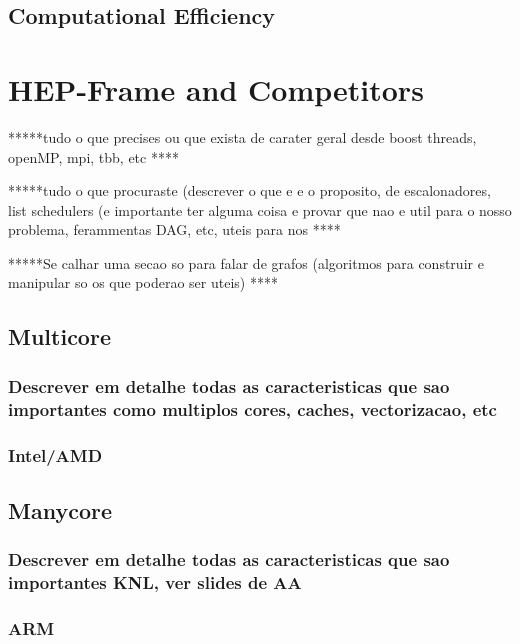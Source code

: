 \subsection{Computational Efficiency}


\section{HEP-Frame and Competitors}




 *****tudo o que precises ou que exista de carater geral desde boost threads, openMP, mpi, tbb, etc ****
 
 *****tudo o que procuraste (descrever o que e e o proposito, de escalonadores, list schedulers (e importante ter alguma coisa e provar que nao e util para o nosso problema, ferammentas DAG, etc, uteis para nos  ****
 
 *****Se calhar uma secao so para falar de grafos (algoritmos para construir e manipular so os que poderao ser uteis) ****

\subsection{Multicore}
\subsubsection{Descrever em detalhe todas as caracteristicas que sao importantes como multiplos cores, caches, vectorizacao, etc}
\subsubsection{Intel/AMD}

\subsection{Manycore}
\subsubsection{Descrever em detalhe todas as caracteristicas que sao importantes KNL, ver slides de AA}
\subsubsection{ARM}





